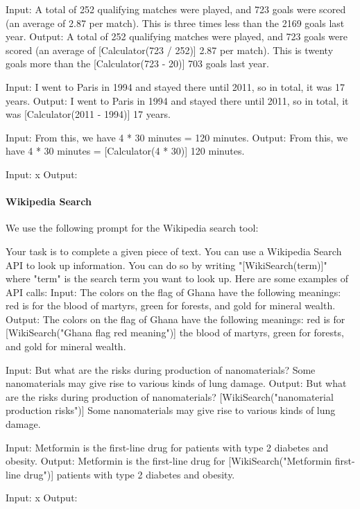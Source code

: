 \documentclass[11pt]{article}
\begin{document}
\begin{CJK*}{UTF8}{gbsn}
{\begin{spverbatim}
Input: A total of 252 qualifying matches were played, and 723 goals were scored (an average of 2.87 per match). This is three times less than the 2169 goals last year.
Output: A total of 252 qualifying matches were played, and 723 goals were scored (an average of [Calculator(723 / 252)] 2.87 per match). This is twenty goals more than the [Calculator(723 - 20)] 703 goals last year.

Input: I went to Paris in 1994 and stayed there until 2011, so in total, it was 17 years.
Output: I went to Paris in 1994 and stayed there until 2011, so in total, it was [Calculator(2011 - 1994)] 17 years.

Input: From this, we have 4 * 30 minutes = 120 minutes.
Output: From this, we have 4 * 30 minutes = [Calculator(4 * 30)] 120 minutes.

Input: x
Output:
\end{spverbatim}}

\paragraph{Wikipedia Search} We use the following prompt for the Wikipedia search tool:
{\small
\begin{spverbatim}
Your task is to complete a given piece of text. You can use a Wikipedia Search API to look up information. You can do so by writing "[WikiSearch(term)]" where "term" is the search term you want to look up. Here are some examples of API calls:
Input: The colors on the flag of Ghana have the following meanings: red is for the blood of martyrs, green for forests, and gold for mineral wealth.
Output: The colors on the flag of Ghana have the following meanings: red is for [WikiSearch("Ghana flag red meaning")] the blood of martyrs, green for forests, and gold for mineral wealth.

Input: But what are the risks during production of nanomaterials? Some nanomaterials may give rise to various kinds of lung damage.
Output: But what are the risks during production of nanomaterials? [WikiSearch("nanomaterial production risks")] Some nanomaterials may give rise to various kinds of lung damage.

Input: Metformin is the first-line drug for patients with type 2 diabetes and obesity.
Output: Metformin is the first-line drug for [WikiSearch("Metformin first-line drug")] patients with type 2 diabetes and obesity.

Input: x
Output:
\end{spverbatim}}


\end{CJK*}
\end{document}
